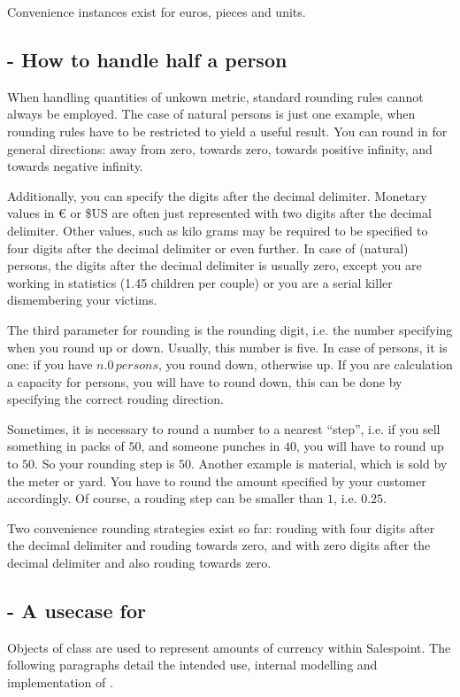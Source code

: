 Convenience instances exist for euros, pieces and units.

\subsection{ - How to handle half a person}
When handling quantities of unkown metric, standard rounding rules cannot always be employed.
The case of natural persons is just one example, when rounding rules have to be restricted to yield a useful result.
You can round in for general directions: away from zero, towards zero, towards positive infinity, and towards negative infinity.

Additionally, you can specify the digits after the decimal delimiter.
Monetary values in \euro{} or \$US are often just represented with two digits after the decimal delimiter.
Other values, such as kilo grams may be required to be specified to four digits after the decimal delimiter or even further.
In case of (natural) persons, the digits after the decimal delimiter is usually zero, except you are working in statistics (1.45 children per couple) or you are a serial killer dismembering your victims.

The third parameter for rounding is the rounding digit, i.e. the number specifying when you round up or down.
Usually, this number is five.
In case of persons, it is one: if you have $n.0\,persons$, you round down, otherwise up.
If you are calculation a capacity for persons, you will have to round down, this can be done by specifying the correct rouding direction.

Sometimes, it is necessary to round a number to a nearest ``step'', i.e. if you sell something in packs of $50$, and someone punches in $40$, you will have to round up to $50$.
So your rounding step is $50$.
Another example is material, which is sold by the meter or yard.
You have to round the amount specified by your customer accordingly.
Of course, a rouding step can be smaller than $1$, i.e. $0.25$.

Two convenience rounding strategies exist so far:  rouding with four digits after the decimal delimiter and rouding towards zero, and  with zero digits after the decimal delimiter and also rouding towards zero.

\subsection{ - A usecase for }
Objects of class  are used to represent amounts of currency within Salespoint.
The following paragraphs detail the intended use, internal modelling and implementation of .

